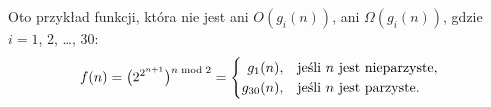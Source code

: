 \subproblem %
Oto przykład funkcji, która nie jest ani $O(g_i(n))$, ani $\Omega(g_i(n))$, gdzie $i=1$, 2, \dots, 30:
\[
	f(n) = \bigl(2^{2^{n+1}}\bigr)^{n\bmod2} =
	\begin{cases}
		\hfill g_1(n), & \text{jeśli $n$ jest nieparzyste}, \\
		g_{30}(n), & \text{jeśli $n$ jest parzyste}.
	\end{cases}
\]
